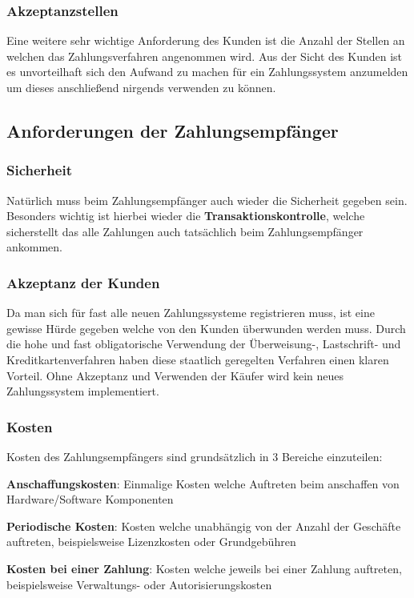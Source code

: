 \subsubsection{Akzeptanzstellen}
Eine weitere sehr wichtige Anforderung des Kunden ist die Anzahl der Stellen an welchen das Zahlungsverfahren angenommen wird. Aus der Sicht des Kunden ist es unvorteilhaft sich den Aufwand zu machen für ein Zahlungssystem anzumelden um dieses anschließend nirgends verwenden zu können.

\subsection{Anforderungen der Zahlungsempfänger}
\subsubsection{Sicherheit}
Natürlich muss beim Zahlungsempfänger auch wieder die Sicherheit gegeben sein. Besonders wichtig ist hierbei wieder die \textbf{Transaktionskontrolle}, welche sicherstellt das alle Zahlungen auch tatsächlich beim Zahlungsempfänger ankommen. 

\subsubsection{Akzeptanz der Kunden}
Da man sich für fast alle neuen Zahlungssysteme registrieren muss, ist eine gewisse Hürde gegeben welche von den Kunden überwunden werden muss. Durch die hohe und fast obligatorische Verwendung der Überweisung-, Lastschrift- und Kreditkartenverfahren haben diese staatlich geregelten Verfahren einen klaren Vorteil. Ohne Akzeptanz und Verwenden der Käufer wird kein neues Zahlungssystem implementiert.

\subsubsection{Kosten}
Kosten des Zahlungsempfängers sind grundsätzlich in 3 Bereiche einzuteilen:

\textbf{Anschaffungskosten}: Einmalige Kosten welche Auftreten beim anschaffen von Hardware/Software Komponenten

\textbf{Periodische Kosten}: Kosten welche unabhängig von der Anzahl der Geschäfte auftreten, beispielsweise Lizenzkosten oder Grundgebühren

\textbf{Kosten bei einer Zahlung}: Kosten welche jeweils bei einer Zahlung auftreten, beispielsweise Verwaltungs- oder Autorisierungskosten




